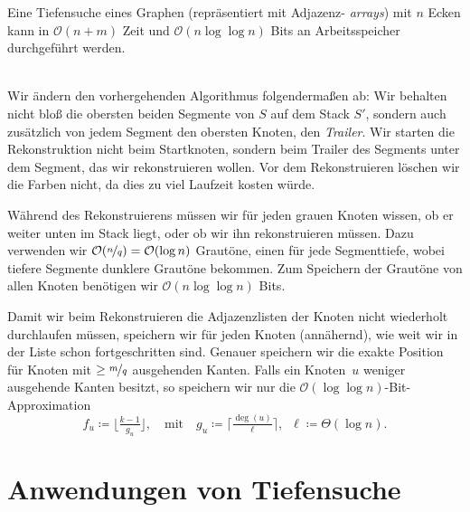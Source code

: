 \documentclass{cheat-sheet}
\newcommand{\ceil}[1]{\lceil #1 \rceil} %
\newcommand{\floor}[1]{\lfloor #1 \rfloor} %
\renewcommand{\O}{\mathcal{O}} %
\begin{document}

\begin{thm}
  Eine Tiefensuche eines Graphen (repräsentiert mit Adjazenz- \textit{arrays}) mit $n$ Ecken kann in $\O(n+m)$ Zeit und $\O(n \log \log n)$ Bits an Arbeitsspeicher durchgeführt werden.
\end{thm}

\begin{alg} \mbox{}\\
  Wir ändern den vorhergehenden Algorithmus folgendermaßen ab:
  Wir behalten nicht bloß die obersten beiden Segmente von $S$ auf dem Stack $S'$, sondern auch zusätzlich von jedem Segment den obersten Knoten, den \textit{Trailer}.
  Wir starten die Rekonstruktion nicht beim Startknoten, sondern beim Trailer des Segments unter dem Segment, das wir rekonstruieren wollen.
  Vor dem Rekonstruieren löschen wir die Farben nicht, da dies zu viel Laufzeit kosten würde.
\end{alg}

\begin{samepage}

Während des Rekonstruierens müssen wir für jeden grauen Knoten wissen, ob er weiter unten im Stack liegt, oder ob wir ihn rekonstruieren müssen.
Dazu verwenden wir $\O(\nicefrac{n}{q}) = \O(\log n)$ Grautöne, einen für jede Segmenttiefe, wobei tiefere Segmente dunklere Grautöne bekommen.
Zum Speichern der Grautöne von allen Knoten benötigen wir $\O(n \log \log n)$ Bits.

Damit wir beim Rekonstruieren die Adjazenzlisten der Knoten nicht wiederholt durchlaufen müssen, speichern wir für jeden Knoten (annähernd), wie weit wir in der Liste schon fortgeschritten sind.
Genauer speichern wir die exakte Position für Knoten mit $\geq \nicefrac{m}{q}$ ausgehenden Kanten.
Falls ein Knoten~$u$ weniger ausgehende Kanten besitzt, so speichern wir nur die $\O(\log \log n)$-Bit-Approximation
\[
  f_u \coloneqq \floor{\tfrac{k-1}{g_u}}, \quad
  \text{mit} \quad
  g_u \coloneqq \ceil{\tfrac{\deg(u)}{\ell}}, \enspace
  \ell \coloneqq \Theta(\log n).
\]

\section{Anwendungen von Tiefensuche}

\end{samepage}
\end{document}
